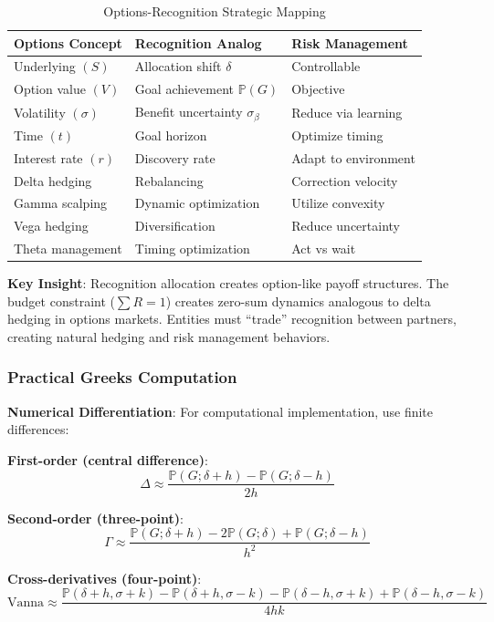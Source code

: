 \begin{table}[h]
\centering
\begin{tabular}{lll}
\toprule
\textbf{Options Concept} & \textbf{Recognition Analog} & \textbf{Risk Management} \\
\midrule
Underlying $(S)$ & Allocation shift $\delta$ & Controllable \\
Option value $(V)$ & Goal achievement $\mathbb{P}(G)$ & Objective \\
Volatility $(\sigma)$ & Benefit uncertainty $\sigma_\beta$ & Reduce via learning \\
Time $(t)$ & Goal horizon & Optimize timing \\
Interest rate $(r)$ & Discovery rate & Adapt to environment \\
\midrule
Delta hedging & Rebalancing & Correction velocity \\
Gamma scalping & Dynamic optimization & Utilize convexity \\
Vega hedging & Diversification & Reduce uncertainty \\
Theta management & Timing optimization & Act vs wait \\
\bottomrule
\end{tabular}
\caption{Options-Recognition Strategic Mapping}
\end{table}

\textbf{Key Insight}: Recognition allocation creates option-like payoff structures. The budget constraint ($\sum R = 1$) creates zero-sum dynamics analogous to delta hedging in options markets. Entities must ``trade'' recognition between partners, creating natural hedging and risk management behaviors.

\subsubsection{Practical Greeks Computation}

\textbf{Numerical Differentiation}: For computational implementation, use finite differences:

\textbf{First-order (central difference)}:
\[ \Delta \approx \frac{\mathbb{P}(G;\delta + h) - \mathbb{P}(G;\delta - h)}{2h} \]

\textbf{Second-order (three-point)}:
\[ \Gamma \approx \frac{\mathbb{P}(G;\delta + h) - 2\mathbb{P}(G;\delta) + \mathbb{P}(G;\delta - h)}{h^2} \]

\textbf{Cross-derivatives (four-point)}:
\[ \text{Vanna} \approx \frac{\mathbb{P}(\delta+h,\sigma+k) - \mathbb{P}(\delta+h,\sigma-k) - \mathbb{P}(\delta-h,\sigma+k) + \mathbb{P}(\delta-h,\sigma-k)}{4hk} \]

